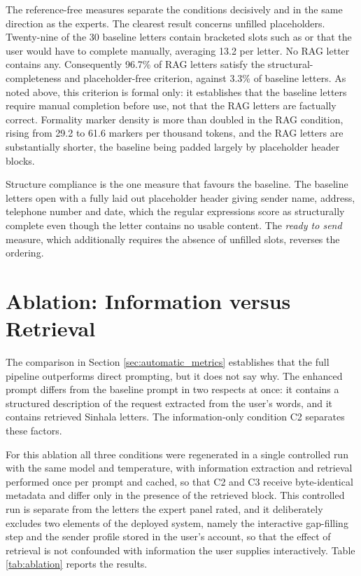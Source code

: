 \documentclass[12pt]{uomthesis}
\newcommand{\si}[1]{{\sinhalafont #1}}
\begin{document}
The reference-free measures separate the conditions decisively and in the same direction as the experts. The clearest result concerns unfilled placeholders. Twenty-nine of the 30 baseline letters contain bracketed slots such as \si{[ඔබගේ නම]} or \si{[ආයතනයේ නම]} that the user would have to complete manually, averaging 13.2 per letter. No RAG letter contains any. Consequently 96.7\% of RAG letters satisfy the structural-completeness and placeholder-free criterion, against 3.3\% of baseline letters. As noted above, this criterion is formal only: it establishes that the baseline letters require manual completion before use, not that the RAG letters are factually correct. Formality marker density is more than doubled in the RAG condition, rising from 29.2 to 61.6 markers per thousand tokens, and the RAG letters are substantially shorter, the baseline being padded largely by placeholder header blocks.

Structure compliance is the one measure that favours the baseline. The baseline letters open with a fully laid out placeholder header giving sender name, address, telephone number and date, which the regular expressions score as structurally complete even though the letter contains no usable content. The \emph{ready to send} measure, which additionally requires the absence of unfilled slots, reverses the ordering.

\section{Ablation: Information versus Retrieval}
\label{sec:ablation}

The comparison in Section \ref{sec:automatic_metrics} establishes that the full pipeline outperforms direct prompting, but it does not say why. The enhanced prompt differs from the baseline prompt in two respects at once: it contains a structured description of the request extracted from the user's words, and it contains retrieved Sinhala letters. The information-only condition C2 separates these factors.

For this ablation all three conditions were regenerated in a single controlled run with the same model and temperature, with information extraction and retrieval performed once per prompt and cached, so that C2 and C3 receive byte-identical metadata and differ only in the presence of the retrieved block. This controlled run is separate from the letters the expert panel rated, and it deliberately excludes two elements of the deployed system, namely the interactive gap-filling step and the sender profile stored in the user's account, so that the effect of retrieval is not confounded with information the user supplies interactively. Table \ref{tab:ablation} reports the results.
\end{document}
